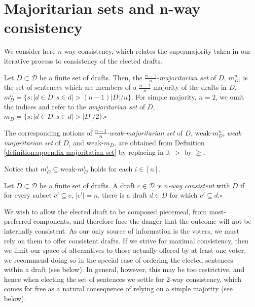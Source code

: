 \documentclass[sigconf]{aamas}  %
\newcommand{\qqed}{\hfill$\square$}
\newcommand{\calD}{\mathcal{D}}
\begin{document}




\appendix


\section{Majoritarian sets and n-way consistency}


We consider here $n$-way consistency, which relates the supermajority taken in our iterative process to consistency of the elected drafts.

\begin{definition}\label{definition:appendix-majoritatian-set}
Let $D \subset \calD$ be a finite set of drafts. Then, the \emph{$\frac{n-1}{n}$-majoritarian set} of $D$, $m^n_D$, is  the set of sentences which are members of a $\frac{n-1}{n}$-majority of the drafts in $D$, $m^n_D = \{s: |d \in D : s \in d| > (n-1)|D|/n\}$.
%
For simple majority, $n=2$, we omit the indices and refer to the \emph{majoritarian set} of $D$, $m_D = \{s: |d \in D : s \in d| > |D|/2\}$.\qqed
%
\end{definition}

The corresponding notions of \emph{$\frac{n-1}{n}$-weak-majoritarian set} of $D$, $\textrm{weak-}m^n_D$, \emph{weak majoritarian set} of $D$, and $\textrm{weak-}m_D$, are obtained from Definition \ref{definition:appendix-majoritatian-set} by replacing  in it $>$ by $\ge$.

Notice that $m^i_D \subseteq \textrm{weak-}m^i_D$ holds for each $i \in [n]$.

\begin{definition}
Let $D \subset \calD$ be a finite set of drafts. A draft $c \in \calD$ is \emph{$n$-way consistent} with $D$ if for every subset $c' \subseteq c$, $|c'|=n$, there is a draft $d \in D$ for which $c' \subseteq d$.\qqed
\end{definition}

We wish to allow the elected draft to be composed piecemeal, from most-preferred components, and therefore face the danger that the outcome will not be internally consistent. As our only source of information is the voters, we must rely on them to offer consistent drafts.  If we strive for maximal consistency, then we limit our space of alternatives to those actually offered by at least one voter; we recommend doing so in the special case of ordering the elected sentences within a draft (see below).  In general, however, this may be too restrictive, and hence when electing the set of sentences we settle for $2$-way consistency, which comes for free as a natural consequence of relying on a simple majority (see below).
\end{document}
